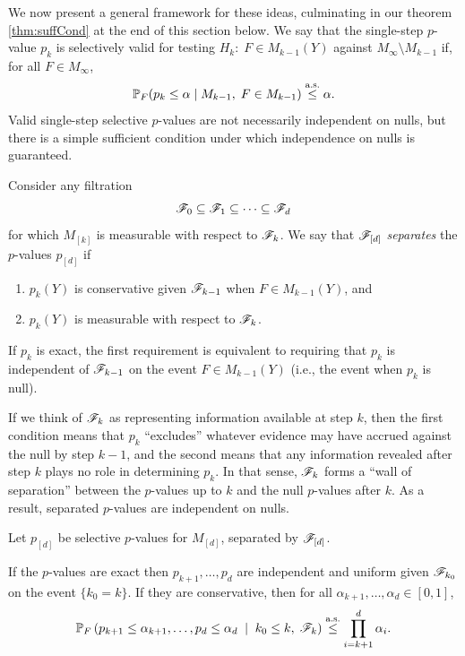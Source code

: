 \documentclass{article}
\begin{document}
\medskip

We now present a general framework for these ideas, culminating in our theorem \ref{thm:suffCond} at the end of this section below.
We say that the  single-step $p$-value $p_k$ is selectively valid for testing $H_k:\; F \in M_{k-1}(Y)$ against $M_\infty \setminus M_{k-1}$ if, for all $F\in M_\infty$,
\[
\mathbb{P}_F(p_k \leq \alpha \mid M_{k-1},\; F\in M_{k-1}) \overset{\textrm{a.s.}}{\leq} \alpha.
\]
Valid single-step selective $p$-values are not necessarily independent on nulls, but there is a simple sufficient condition under which independence on nulls is guaranteed.

Consider any filtration
\[
\mathscr{F}_0 \subseteq \mathscr{F}_1 \subseteq \cdots \subseteq \mathscr{F}_d
\]
for which $M_{[k]}$ is measurable with respect to $\mathscr{F}_k$. We say that $\mathscr{F}_{[d]}$ {\em separates} the $p$-values $p_{[d]}$ if 
\begin{enumerate}
\item $p_k(Y)$ is conservative given $\mathscr{F}_{k-1}$ 
  when $F\in M_{k-1}(Y)$, and
\item $p_k(Y)$ is measurable with respect to $\mathscr{F}_k$.
\end{enumerate}
If $p_k$ is exact, the first requirement is equivalent to requiring that $p_k$ is independent of $\mathscr{F}_{k-1}$ on the event $F\in M_{k-1}(Y)$ (i.e., the event when $p_k$ is null).

If we think of $\mathscr{F}_k$ as representing information available at step $k$, then the first condition means that $p_k$ ``excludes'' whatever evidence may have accrued against the null by step $k-1$, and the second means that any information revealed after step $k$ plays no role in determining $p_k$. In that sense, $\mathscr{F}_k$ forms a ``wall of separation'' between the $p$-values up to $k$ and the null $p$-values after $k$. As a result, separated $p$-values are independent on nulls.

\begin{proposition}\label{prop:jointConserv}

  Let $p_{[d]}$ be selective $p$-values for $M_{[d]}$, 
  separated by $\mathscr{F}_{[d]}$.

  If the $p$-values are exact then $p_{k+1}, \ldots, p_d$ are
  independent and uniform given $\mathscr{F}_{k_0}$ on the event $\{k_0=k\}$.
  If they are conservative, then for all
  $\alpha_{k+1},\ldots,\alpha_d \in [0,1]$,
  \begin{equation}\label{eq:jointConserv}
  \mathbb{P}_F\left(p_{k+1}\leq \alpha_{k+1}, \ldots, p_d \leq \alpha_d\;
    \mid\; k_0 \leq k, \; \mathscr{F}_k\right) \overset{\textrm{a.s.}}{\leq} \prod_{i=k+1}^d
  \alpha_i.
  \end{equation}
\end{proposition}
\end{document}
